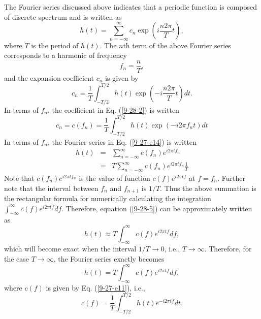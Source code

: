\documentclass{article}
\begin{document}
The Fourier series discussed above indicates that a periodic function is
composed of discrete spectrum and is written as
\begin{equation}
  \label{9-27-e14} h (t) = \sum_{n = - \infty}^{\infty} c_n \exp \left( i
  \frac{n 2 \pi}{T} t \right) ,
\end{equation}
where $T$ is the period of $h (t)$. The $n$th term of the above Fourier series
corresponds to a harmonic of frequency
\begin{equation}
  \label{9-27-e10} f_n = \frac{n}{T},
\end{equation}
and the expansion coefficient $c_n$ is given by
\begin{equation}
  \label{9-28-2} c_n = \frac{1}{T} \int_{- T / 2}^{T / 2} h (t) \exp \left( -
  i \frac{n 2 \pi}{T} t \right) d t.
\end{equation}
In terms of $f_n$, the coefficient in Eq. (\ref{9-28-2}) is written
\begin{equation}
  \label{9-27-e11} c_n = c (f_n) = \frac{1}{T} \int_{- T / 2}^{T / 2} h (t)
  \exp (- i 2 \pi f_n t)  d t
\end{equation}
In terms of $f_n$, the Fourier series in Eq. (\ref{9-27-e14}) is written
\begin{eqnarray}
  h (t) & = & \sum_{n = - \infty}^{\infty} c (f_n) e^{i 2 \pi t f_n}
  \nonumber\\
  & = & T \sum_{n = - \infty}^{\infty} c (f_n) e^{i 2 \pi t f_n} \frac{1}{T} 
  \label{9-28-5}
\end{eqnarray}
Note that $c (f_n) e^{i 2 \pi t f_n}$ is the value of function $c (f) e^{i 2
\pi t f}$ at $f = f_n$. Further note that the interval between $f_n$ and $f_{n
+ 1}$ is $1 / T$. Thus the above summation is the rectangular formula for
numerically calculating the integration $\int_{- \infty}^{\infty} c (f) e^{i 2
\pi t f} d f$. Therefore, equation (\ref{9-28-5}) can be approximately written
as
\begin{equation}
  h (t) \approx T \int_{- \infty}^{\infty} c (f) e^{i 2 \pi t f} d f,
\end{equation}
which will become exact when the interval $1 / T \rightarrow 0$, i.e., $T
\rightarrow \infty$. Therefore, for the case $T \rightarrow \infty$, the
Fourier series exactly becomes
\begin{equation}
  \label{9-28-6} h (t) = T \int_{- \infty}^{\infty} c (f) e^{i 2 \pi t f} d f,
\end{equation}
where $c (f)$ is given by Eq. (\ref{9-27-e11}), i.e.,
\begin{equation}
  \label{9-28-7} c (f) = \frac{1}{T} \int_{- T / 2}^{T / 2} h (t) e^{- i 2 \pi
  t f} d t.
\end{equation}
\end{document}
